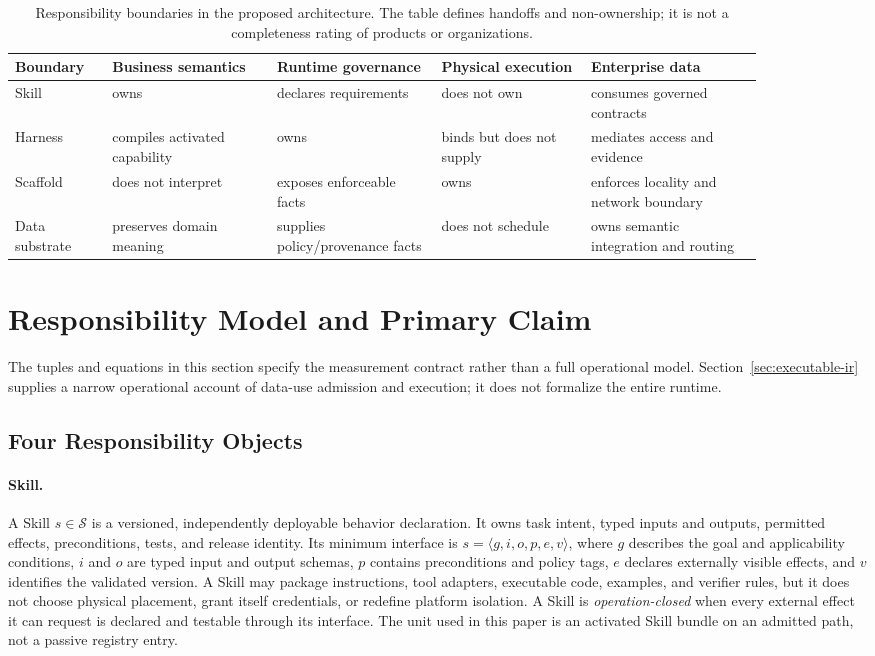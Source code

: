 \begin{table}[t]
\centering
\caption{Responsibility boundaries in the proposed architecture. The table defines handoffs and non-ownership; it is not a completeness rating of products or organizations.}
\label{tab:responsibility-boundary}
\begin{tabular}{lp{0.22\linewidth}p{0.22\linewidth}p{0.20\linewidth}p{0.23\linewidth}}
\hline
Boundary & Business semantics & Runtime governance & Physical execution & Enterprise data \\
\hline
Skill & owns & declares requirements & does not own & consumes governed contracts \\
Harness & compiles activated capability & owns & binds but does not supply & mediates access and evidence \\
Scaffold & does not interpret & exposes enforceable facts & owns & enforces locality and network boundary \\
Data substrate & preserves domain meaning & supplies policy/provenance facts & does not schedule & owns semantic integration and routing \\
\hline
\end{tabular}
\end{table}

\section{Responsibility Model and Primary Claim}
\label{sec:model}

The tuples and equations in this section specify the measurement contract rather than a full operational model. Section~\ref{sec:executable-ir} supplies a narrow operational account of data-use admission and execution; it does not formalize the entire runtime.

\subsection{Four Responsibility Objects}
\label{sec:runtime-objects}

\paragraph{Skill.}
A Skill $s\in\mathcal{S}$ is a versioned, independently deployable behavior declaration. It owns task intent, typed inputs and outputs, permitted effects, preconditions, tests, and release identity. Its minimum interface is $s=\langle g,i,o,p,e,v\rangle$, where $g$ describes the goal and applicability conditions, $i$ and $o$ are typed input and output schemas, $p$ contains preconditions and policy tags, $e$ declares externally visible effects, and $v$ identifies the validated version. A Skill may package instructions, tool adapters, executable code, examples, and verifier rules, but it does not choose physical placement, grant itself credentials, or redefine platform isolation. A Skill is \textit{operation-closed} when every external effect it can request is declared and testable through its interface. The unit used in this paper is an activated Skill bundle on an admitted path, not a passive registry entry.

